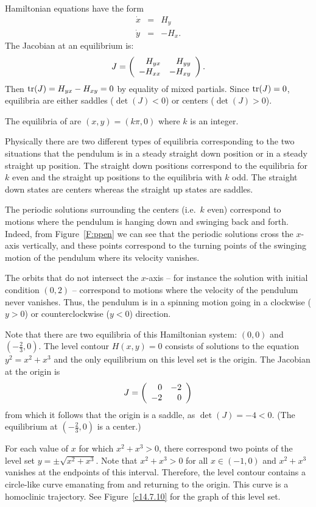 \soln  Hamiltonian equations have the form 
\begin{eqnarray*}
\dot{x} & = & H_y \\
\dot{y} & = & -H_x.
\end{eqnarray*}
The Jacobian at an equilibrium is:
\[
J = \left(\begin{array}{rr} H_{yx} & H_{yy}\\ -H_{xx} &-H_{xy}\end{array}\right).
\]
Then ${\rm tr}(J)=H_{yx}-H_{xy}=0$ by equality of mixed partials.  Since 
${\rm tr}(J)=0$, equilibria are either saddles ($\det(J)<0$) or centers
($\det(J)>0$).



 \ans The equilibria of  are
$(x,y)=(k\pi,0)$ where $k$ is an integer.

\soln Physically there are two different types of equilibria corresponding
to the two situations that the pendulum is in a steady straight down
position or in a steady straight up position.  The straight down
positions correspond to the equilibria for $k$ even and the straight
up positions to the equilibria with $k$ odd.  The straight down
states are centers whereas the straight up states are saddles.

The periodic solutions surrounding the centers (i.e.\ $k$ even) correspond to 
motions where the pendulum is hanging down and swinging back and forth.
Indeed, from Figure~\ref{F:ppen} we can see that the periodic solutions
cross the $x$-axis vertically, and these points correspond to the turning
points of the swinging motion of the pendulum where its velocity vanishes.

The orbits that do not intersect the $x$-axis -- for instance the
solution with initial condition $(0,2)$ -- correspond to motions where
the velocity of the pendulum never vanishes.  Thus, the pendulum is
in a spinning motion going in a clockwise ($y>0$) or counterclockwise
($y<0$) direction.



Note that there are two equilibria of this Hamiltonian system: $(0,0)$ and
$(-\frac{2}{3},0)$.  The level contour $H(x,y)=0$ consists of solutions to 
the equation $y^2=x^2+x^3$ and the only equilibrium on this level set is the
origin.  The Jacobian at the origin is
\[
J = \left(\begin{array}{rr} 0 & -2\\ -2 &0\end{array}\right)
\]
from which it follows that the origin is a saddle, as $\det(J)=-4<0$. (The
equilibrium at $(-\frac{2}{3},0)$ is a center.)

For each value of $x$ for which $x^2+x^3>0$, there correspond two points of
the level set $y=\pm\sqrt{x^2+x^3}$.  Note that $x^2+x^3>0$ for all 
$x\in(-1,0)$ and $x^2+x^3$ vanishes at the endpoints of this interval. 
Therefore, the level contour contains a circle-like curve emanating from and
returning to the origin.  This curve is a homoclinic trajectory.  See
Figure~\ref{c14.7.10} for the graph of this level set.
 
